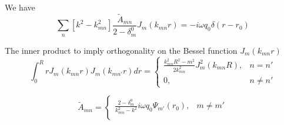 \documentclass[%
 reprint,
 amsmath,amssymb,
 aps,
]{revtex4-2}
\begin{document}
We have
\begin{equation}
    \sum_n \left[ k^2 - k_{mn}^2 \right] \frac{\tilde{A}_{mn}}{2 - \delta_m^0} J_m(k_{mn}r) = - i \omega q_0 \delta(r - r_0)
\end{equation}

The inner product to imply orthogonality on the Bessel function $J_m (k_{mn} r)$
\begin{equation}
        \int_0^R r J_m (k_{mn} r) J_m (k_{mn'} r) dr = \begin{cases}
            \frac{k^2_{mn} R^2 - m^2}{2 k^2_{mn}} J^2_m (k_{mn} R), &n = n'\\
            0, & n \ne n'
        \end{cases}
\end{equation}

\begin{equation}
    \tilde{A}_{mn} =
    \begin{cases}
        \frac{2 - \delta_m^0}{k^2_{mn} - k^2} i \omega q_0 \Psi_{m'}(r_0), &m \ne m'\\

    \end{cases}
\end{equation}

\nocite{*}
\end{document}
